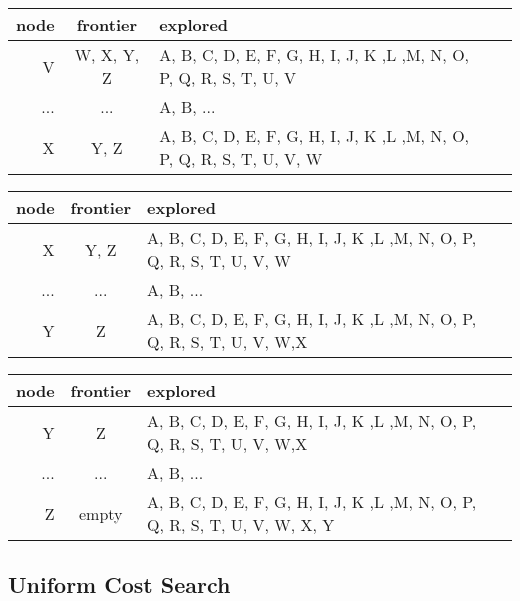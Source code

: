 \documentclass[11pt]{article} %
\begin{document}
\begin{tabularx}{\textwidth}{|r|c|X|X|}
\hline
node & frontier & explored  \\
\hline
V&W, X, Y, Z&A, B, C, D, E, F, G, H, I, J, K ,L ,M, N, O, P, Q, R, S, T, U, V\\
\hline
...& ...&A, B, ...\\
\hline
X&Y, Z&A, B, C, D, E, F, G, H, I, J, K ,L ,M, N, O, P, Q, R, S, T, U, V, W\\
\hline
\end{tabularx}

\begin{tabularx}{\textwidth}{|r|c|X|X|}
\hline
node & frontier & explored  \\
\hline
X&Y, Z&A, B, C, D, E, F, G, H, I, J, K ,L ,M, N, O, P, Q, R, S, T, U, V, W\\
\hline
...& ...&A, B, ...\\
\hline
Y&Z&A, B, C, D, E, F, G, H, I, J, K ,L ,M, N, O, P, Q, R, S, T, U, V, W,X\\
\hline
\end{tabularx}

\begin{tabularx}{\textwidth}{|r|c|X|X|}
\hline
node & frontier & explored  \\
\hline
Y&Z&A, B, C, D, E, F, G, H, I, J, K ,L ,M, N, O, P, Q, R, S, T, U, V, W,X\\
\hline
...& ...&A, B, ...\\
\hline
Z&empty&A, B, C, D, E, F, G, H, I, J, K ,L ,M, N, O, P, Q, R, S, T, U, V, W, X, Y\\
\hline
\end{tabularx}


\subsection{Uniform Cost Search}
\end{document}
